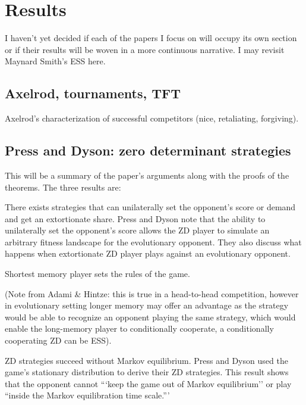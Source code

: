 \chapter{Results}
I haven't yet decided if each of the papers I focus on will occupy its own section or if their results will be woven in a more continuous narrative. I may revisit Maynard Smith's ESS here.

\section{Axelrod, tournaments, TFT}
Axelrod's characterization of successful competitors (nice, retaliating, forgiving).

\section{Press and Dyson: zero determinant strategies}
This will be a summary of the paper's arguments along with the proofs of the theorems. The three results are:

\begin{theorem}
There exists strategies that can unilaterally set the opponent's score or demand and get an extortionate share. Press and Dyson note that the ability to unilaterally set the opponent's score allows the ZD player to simulate an arbitrary fitness landscape for the evolutionary opponent. They also discuss what happens when extortionate ZD player plays against an evolutionary opponent. 
\end{theorem}
\begin{theorem}
Shortest memory player sets the rules of the game.

(Note from Adami \& Hintze: this is true in a head-to-head competition, however in evolutionary setting longer memory may offer an advantage as the strategy would be able to recognize an opponent playing the same strategy, which would enable the long-memory player to conditionally cooperate, a conditionally cooperating ZD can be ESS).
\end{theorem}
\begin{theorem}
ZD strategies succeed without Markov equilibrium. Press and Dyson used the game's stationary distribution to derive their ZD strategies. This result shows that the opponent cannot  ```keep the game out of Markov equilibrium'' or play ``inside the Markov equilibration time scale.'''
\end{theorem}


